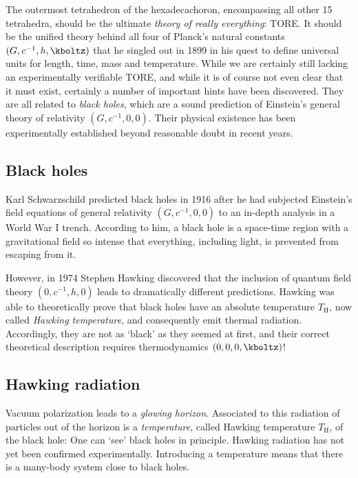 
\newpage {}
\label{sec:1111}

The outermost tetrahedron of the hexadecachoron, encompassing all other 15 tetrahedra, should be the ultimate \emph{theory of really everything}: TORE. It should be the unified theory behind all four of Planck's natural constants $(G,c^{-1},h,\kboltz)$ that he singled out in 1899 in his quest to define universal units for length, time, mass and temperature. While we are certainly still lacking an experimentally verifiable TORE, and while it is of course not even clear that it must exist, certainly a number of important hints have been discovered. They are all related to \emph{black holes}, which are a sound prediction of Einstein's general theory of relativity $(G,c^{-1},0,0)$. Their physical existence has been experimentally established beyond reasonable doubt in recent years.


\subsection*{Black holes}

Karl Schwarzschild predicted black holes in 1916 after he had subjected Einstein's field equations of general relativity $(G,c^{-1},0,0)$ to an in-depth analysis in a  World War I trench. According to him, a black hole is a space-time region with a gravitational field so intense that everything, including light, is prevented from escaping from it.

However, in 1974 Stephen Hawking discovered that the inclusion of quantum field theory $(0,c^{-1},h,0)$ leads to dramatically different predictions. Hawking was able to theoretically prove that black holes have an absolute temperature $T_\mathrm{H}$, now called \emph{Hawking temperature}, and consequently emit thermal radiation. Accordingly, they are not as \enquote*{black} as they seemed at first, and their correct theoretical description requires thermodynamics $(0,0,0,\kboltz)$!


\subsection*{Hawking radiation}

Vacuum polarization leads to a \emph{glowing horizon}. Associated to this radiation of particles out of the horizon is a \emph{temperature}, called Hawking temperature $T_{\text{H}}$, of the black hole: One can \enquote*{see} black holes in principle. Hawking radiation has not yet been confirmed experimentally. Introducing a temperature means that there is a many-body system close to black holes. 


